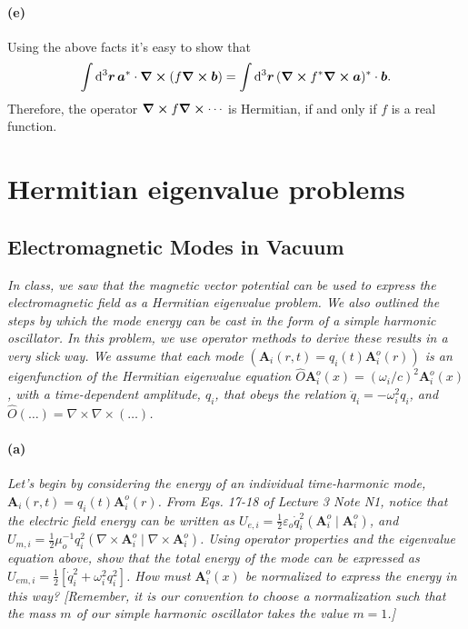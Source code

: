 \documentclass[hyperref, a4paper]{article}
\begin{document}
\paragraph*{(e)} Using the above facts it's easy to show that 
\begin{equation}
    \int \dd[3]{\vb*{r}} \vb*{a}^* \cdot \curl{(f \curl{\vb*{b}})}
    = \int \dd[3]{\vb*{r}} (\curl{f^* \curl{\vb*{a}}})^* \cdot \vb*{b}.
\end{equation}
Therefore, the operator $\curl{f \curl{\cdots}}$ is Hermitian, 
if and only if $f$ is a real function.

\section{Hermitian eigenvalue problems}

\subsection{Electromagnetic Modes in Vacuum}

\textit{In class, we saw that the magnetic vector potential can be used to express the electromagnetic field as a Hermitian eigenvalue problem. We also outlined the steps by which the mode energy can be cast in the form of a simple harmonic oscillator. In this problem, we use operator methods to derive these results in a very slick way. We assume that each mode $\left(\mathbf{A}_i(r, t)=q_i(t) \mathbf{A}_i^o(r)\right)$ is an eigenfunction of the Hermitian eigenvalue equation $\hat{O} \mathbf{A}_i^o(x)=\left(\omega_i / c\right)^2 \mathbf{A}_i^o(x)$, with a time-dependent amplitude, $q_i$, that obeys the relation $\ddot{q}_i=-\omega_i^2 q_i$, and $\hat{O}(\ldots)=\nabla \times \nabla \times(\ldots)$.}

\paragraph*{(a)} \textit{Let's begin by considering the energy of an individual time-harmonic mode, $\mathbf{A}_i(r, t)=q_i(t) \mathbf{A}_i^o(r)$. From Eqs. 17-18 of Lecture 3 Note N1, notice that the electric field energy can be written as $U_{e, i}=\frac{1}{2} \varepsilon_o \dot{q}_i^2\left(\mathbf{A}_i^o \mid \mathbf{A}_i^o\right)$, and $U_{m, i}=\frac{1}{2} \mu_o^{-1} q_i^2\left(\nabla \times \mathbf{A}_i^o \mid \nabla \times \mathbf{A}_i^o\right)$. Using operator properties and the eigenvalue equation above, show that the total energy of the mode can be expressed as $U_{e m, i}=\frac{1}{2}\left[\dot{q}_i^2+\omega_i^2 q_i^2\right]$. How must $\mathbf{A}_i^o(x)$ be normalized to express the energy in this way? [Remember, it is our convention to choose a normalization such that the mass $m$ of our simple harmonic oscillator takes the value $m=1$.]}
\end{document}
